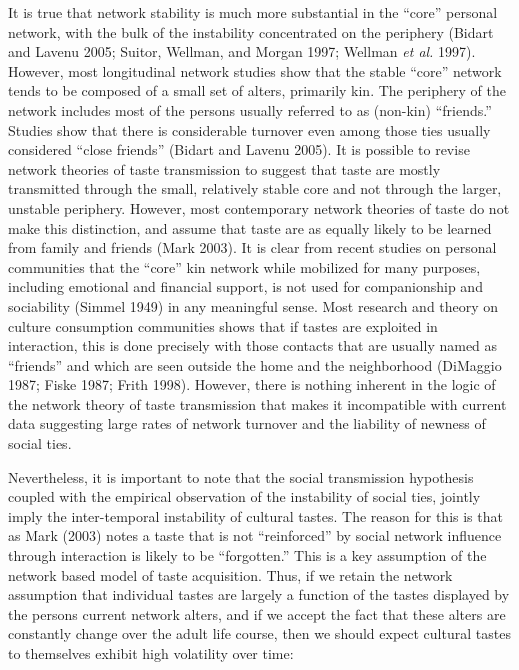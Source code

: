 \documentclass[
]{article}
\begin{document}
It is true that network stability is much more substantial in the ``core'' personal network, with the bulk of the instability concentrated on the periphery (Bidart and Lavenu 2005; Suitor, Wellman, and Morgan 1997; Wellman \emph{et al.} 1997). However, most longitudinal network studies show that the stable ``core'' network tends to be composed of a small set of alters, primarily kin. The periphery of the network includes most of the persons usually referred to as (non-kin) ``friends.'' Studies show that there is considerable turnover even among those ties usually considered ``close friends'' (Bidart and Lavenu 2005). It is possible to revise network theories of taste transmission to suggest that taste are mostly transmitted through the small, relatively stable core and not through the larger, unstable periphery. However, most contemporary network theories of taste do not make this distinction, and assume that taste are as equally likely to be learned from family and friends (Mark 2003). It is clear from recent studies on personal communities that the ``core'' kin network while mobilized for many purposes, including emotional and financial support, is not used for companionship and sociability (Simmel 1949) in any meaningful sense. Most research and theory on culture consumption communities shows that if tastes are exploited in interaction, this is done precisely with those contacts that are usually named as ``friends'' and which are seen outside the home and the neighborhood (DiMaggio 1987; Fiske 1987; Frith 1998). However, there is nothing inherent in the logic of the network theory of taste transmission that makes it incompatible with current data suggesting large rates of network turnover and the liability of newness of social ties.

Nevertheless, it is important to note that the social transmission hypothesis coupled with the empirical observation of the instability of social ties, jointly imply the inter-temporal instability of cultural tastes. The reason for this is that as Mark (2003) notes a taste that is not ``reinforced'' by social network influence through interaction is likely to be ``forgotten.'' This is a key assumption of the network based model of taste acquisition. Thus, if we retain the network assumption that individual tastes are largely a function of the tastes displayed by the persons current network alters, and if we accept the fact that these alters are constantly change over the adult life course, then we should expect cultural tastes to themselves exhibit high volatility over time:
\end{document}

